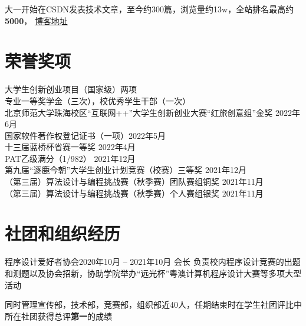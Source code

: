\documentclass[a4paper]{article}
\begin{document}
{    大一开始在CSDN发表技术文章，至今约300篇，浏览量约13w，全站排名最高约\textbf{5000}， \href{https://blog.csdn.net/Dueser}{博客地址}


\section{\textbf{荣誉奖项}}

    \textbullet 大学生创新创业项目（国家级）两项 \\
    \textbullet 专业一等奖学金（三次），校优秀学生干部（一次） \\
    \textbullet 北京师范大学珠海校区“互联网++”大学生创新创业大赛“红旅创意组”金奖 \hfill 2022年6月 \\
    \textbullet 国家软件著作权登记证书（一项）\hfill 2022年5月 \\
    \textbullet 十三届蓝桥杯省赛一等奖 \hfill 2022年4月 \\
    \textbullet PAT乙级满分（1/982） \hfill 2021年12月 \\
    \textbullet 第九届“逐鹿今朝”大学生创业计划竞赛（校赛）三等奖 \hfill 2021年12月 \\
    \textbullet （第三届）算法设计与编程挑战赛（秋季赛）团队赛组铜奖 \hfill 2021年11月 \\
    \textbullet （第三届）算法设计与编程挑战赛（秋季赛）个人赛组银奖 \hfill 2021年11月

\ignorespaces


\section{\textbf{社团和组织经历}}
    
    \resumeTable
    {程序设计爱好者协会}{2020年10月 -- 2021年10月}
    {会长}{}
    负责校内程序设计竞赛的出题和测题以及协会招新，协助学院举办“远光杯”粤澳计算机程序设计大赛等多项大型活动

    \vspace{2pt} 同时管理宣传部，技术部，竞赛部，组织部近40人，任期结束时在学生社团评比中所在社团获得总评\textbf{第一}的成绩 



}
\end{document}
